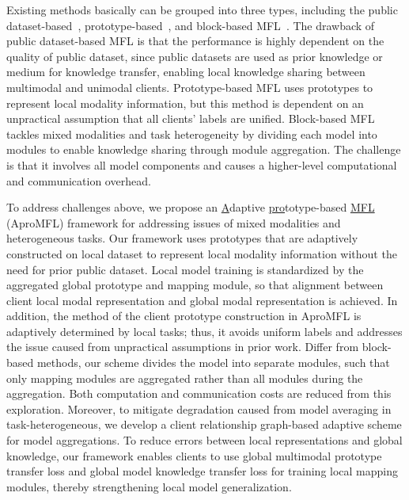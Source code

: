 Existing methods basically can be grouped into three types, including the public dataset-based~\cite{yu2023multimodal,poudel2024car}, prototype-based~\cite{le2024cross}, and block-based MFL~\cite{chen2022fedmsplit}. 
The drawback of public dataset-based MFL is that the performance is highly dependent on the quality of public dataset, since public datasets are used as prior knowledge or medium for knowledge transfer, enabling local knowledge sharing between multimodal and unimodal clients. 
Prototype-based MFL uses prototypes to represent local modality information, %
but this method is dependent on an unpractical assumption that all clients' labels are unified. 
Block-based MFL tackles mixed modalities and task heterogeneity by dividing each model into modules to enable knowledge sharing through module aggregation. 
The challenge is that it involves all model components and causes a higher-level computational and communication overhead.



To address challenges above, we propose an \underline{A}daptive \underline{pro}totype-based \underline{MFL} (AproMFL) framework for addressing issues of mixed modalities and heterogeneous tasks.
Our framework uses prototypes that are adaptively constructed on local dataset to represent local modality information without the need for prior public dataset. 
Local model training is standardized by the aggregated global prototype and mapping module, so that alignment between client local modal representation and global modal representation is achieved. 
In addition, the method of the client prototype construction in AproMFL is adaptively determined by local tasks; thus, it avoids uniform labels and addresses the issue caused from unpractical assumptions in prior work. 
Differ from block-based methods, our scheme divides the model into separate modules, such that only mapping modules are aggregated rather than all modules during the aggregation. 
Both computation and communication costs are reduced from this exploration. 
Moreover, to mitigate degradation caused from model averaging in task-heterogeneous, we develop a client relationship graph-based adaptive scheme for model aggregations. 
To reduce errors between local representations and global knowledge, our framework enables clients to use global multimodal prototype transfer loss and global model knowledge transfer loss for training local mapping modules, thereby strengthening local model generalization. 



